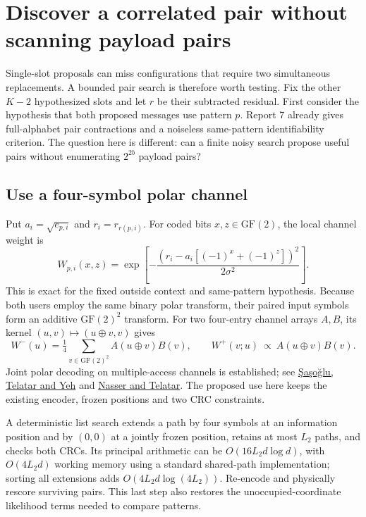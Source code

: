 \documentclass[10pt,a4paper]{article}
\newcommand{\GF}{\mathrm{GF}}
\begin{document}
\section{Discover a correlated pair without scanning payload pairs}
Single-slot proposals can miss configurations that require two simultaneous replacements. A bounded
pair search is therefore worth testing. Fix the other $K-2$ hypothesized slots and let $r$ be their
subtracted residual. First consider the hypothesis that both proposed messages use pattern $p$.
Report 7 already gives full-alphabet pair contractions and a noiseless same-pattern identifiability
criterion. The question here is different: can a finite noisy search propose useful pairs without
enumerating $2^{2b}$ payload pairs?

\subsection{Use a four-symbol polar channel}
Put $a_i=\sqrt{e_{p,i}}$ and $r_i=r_{r(p,i)}$. For coded bits $x,z\in\GF(2)$, the local channel weight is
\begin{equation}
 W_{p,i}(x,z)=\exp\!\left[-\frac{(r_i-a_i[(-1)^x+(-1)^z])^2}{2\sigma^2}\right].
 \label{eq:pairchannel}
\end{equation}
This is exact for the fixed outside context and same-pattern hypothesis. Because both users employ
the same binary polar transform, their paired input symbols form an additive $\GF(2)^2$ transform.
For two four-entry channel arrays $A,B$, its kernel $(u,v)\mapsto(u\oplus v,v)$ gives
\begin{equation}
 W^-(u)=\tfrac14\sum_{v\in\GF(2)^2}A(u\oplus v)B(v),\qquad
 W^+(v;u)\ \propto\ A(u\oplus v)B(v).
 \label{eq:pairkernel}
\end{equation}
Joint polar decoding on multiple-access channels is established; see
\href{https://arxiv.org/abs/1006.4255}{\c{S}a\c{s}o\u{g}lu, Telatar and Yeh} and
\href{https://arxiv.org/abs/1311.3123}{Nasser and Telatar}.
The proposed use here keeps the existing encoder, frozen positions and two CRC constraints.

A deterministic list search extends a path by four symbols at an information position and by $(0,0)$ at a jointly
frozen position, retains at most $L_2$ paths, and checks both CRCs. Its principal arithmetic can be
$O(16L_2d\log d)$, with $O(4L_2d)$ working memory using a standard shared-path implementation;
sorting all extensions adds $O(4L_2d\log(4L_2))$. Re-encode and physically rescore surviving pairs.
This last step also restores the unoccupied-coordinate likelihood terms needed to compare patterns.
\end{document}
